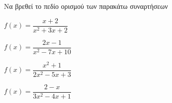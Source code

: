 Να βρεθεί το πεδίο ορισμού των παρακάτω συναρτήσεων
\begin{alist}
\item $ f(x)=\dfrac{x+2}{x^2+3x+2} $
\item $ f(x)=\dfrac{2x-1}{x^2-7x+10} $
\item $ f(x)=\dfrac{x^2+1}{2x^2-5x+3} $
\item $ f(x)=\dfrac{2-x}{3x^2-4x+1} $
\end{alist}
